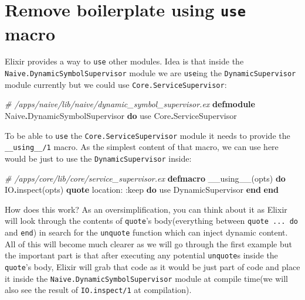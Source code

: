 \documentclass[
  oneside]{book}
\newenvironment{Shaded}{\begin{snugshade}}{\end{snugshade}}
\newcommand{\CommentTok}[1]{\textcolor[rgb]{0.56,0.35,0.01}{\textit{#1}}}
\newcommand{\ConstantTok}[1]{\textcolor[rgb]{0.00,0.00,0.00}{#1}}
\newcommand{\ImportTok}[1]{#1}
\newcommand{\KeywordTok}[1]{\textcolor[rgb]{0.13,0.29,0.53}{\textbf{#1}}}
\newcommand{\NormalTok}[1]{#1}
\newcommand{\OperatorTok}[1]{\textcolor[rgb]{0.81,0.36,0.00}{\textbf{#1}}}
\newcommand{\VariableTok}[1]{\textcolor[rgb]{0.00,0.00,0.00}{#1}}
\begin{document}
\hypertarget{remove-boilerplate-using-use-macro}{%
\section{\texorpdfstring{Remove boilerplate using \texttt{use} macro}{Remove boilerplate using use macro}}\label{remove-boilerplate-using-use-macro}}

Elixir provides a way to \texttt{use} other modules. Idea is that inside the \texttt{Naive.DynamicSymbolSupervisor} module we are \texttt{use}ing the \texttt{DynamicSupervisor} module currently but we could use \texttt{Core.ServiceSupervisor}:

\begin{Shaded}
\begin{Highlighting}[]
\CommentTok{\# /apps/naive/lib/naive/dynamic\_symbol\_supervisor.ex}
\KeywordTok{defmodule} \ConstantTok{Naive}\OperatorTok{.}\ConstantTok{DynamicSymbolSupervisor} \KeywordTok{do}
  \ImportTok{use} \ConstantTok{Core}\OperatorTok{.}\ConstantTok{ServiceSupervisor}
\end{Highlighting}
\end{Shaded}

To be able to \texttt{use} the \texttt{Core.ServiceSupervisor} module it needs to provide the \texttt{\_\_using\_\_/1} macro. As the simplest content of that macro, we can use here would be just to use the \texttt{DynamicSupervisor} inside:

\begin{Shaded}
\begin{Highlighting}[]
  \CommentTok{\# /apps/core/lib/core/service\_supervisor.ex}
  \KeywordTok{defmacro}\NormalTok{ \_\_using\_\_(opts) }\KeywordTok{do}
    \ConstantTok{IO}\OperatorTok{.}\NormalTok{inspect(opts)}
    \KeywordTok{quote} \VariableTok{location:} \VariableTok{:keep} \KeywordTok{do}
      \ImportTok{use} \ConstantTok{DynamicSupervisor}
    \KeywordTok{end}
  \KeywordTok{end}
\end{Highlighting}
\end{Shaded}

How does this work? As an oversimplification, you can think about it as Elixir will look through the contents of \texttt{quote}'s body(everything between \texttt{quote\ ...\ do} and \texttt{end}) in search for the \texttt{unquote} function which can inject dynamic content. All of this will become much clearer as we will go through the first example but the important part is that after executing any potential \texttt{unquote}s inside the \texttt{quote}'s body, Elixir will grab that code as it would be just part of code and place it inside the \texttt{Naive.DynamicSymbolSupervisor} module at compile time(we will also see the result of \texttt{IO.inspect/1} at compilation).
\end{document}
